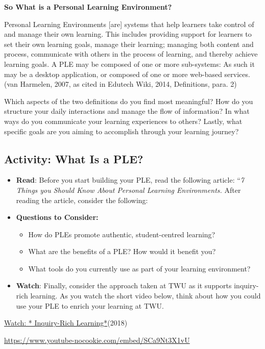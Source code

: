 \documentclass[
  letterpaper,
  DIV=11,
  numbers=noendperiod]{scrreprt}
\providecommand{\tightlist}{%
  \setlength{\itemsep}{0pt}\setlength{\parskip}{0pt}}\usepackage{longtable,booktabs,array}
\begin{document}
\textbf{So What is a Personal Learning Environment?}

Personal Learning Environments {[}are{]} systems that help learners take
control of and manage their own learning. This includes providing
support for learners to set their own learning goals, manage their
learning; managing both content and process, communicate with others in
the process of learning, and thereby achieve learning goals. A PLE may
be composed of one or more sub-systems: As such it may be a desktop
application, or composed of one or more web-based services. (van
Harmelen, 2007, as cited in Edutech Wiki, 2014, Definitions, para. 2)

Which aspects of the two definitions do you find most meaningful? How do
you structure your daily interactions and manage the flow of
information? In what ways do you communicate your learning experiences
to others? Lastly, what specific goals are you aiming to accomplish
through your learning journey?

\subsection{Activity: What Is a PLE?}\label{activity-what-is-a-ple}

\begin{tcolorbox}[enhanced jigsaw, toprule=.15mm, colback=white, colframe=quarto-callout-note-color-frame, bottomtitle=1mm, leftrule=.75mm, coltitle=black, titlerule=0mm, rightrule=.15mm, colbacktitle=quarto-callout-note-color!10!white, left=2mm, title={Learning Activity}, opacitybacktitle=0.6, opacityback=0, breakable, toptitle=1mm, arc=.35mm, bottomrule=.15mm]

\begin{itemize}
\item
  \textbf{Read}: Before you start building your PLE, read the following
  article: ``\emph{7 Things you Should Know About Personal Learning
  Environments.} After reading the article, consider the following:
\item
  \textbf{Questions to Consider:}

  \begin{itemize}
  \tightlist
  \item
    How do PLEs promote authentic, student-centred learning?
  \item
    What are the benefits of a PLE? How would it benefit you?
  \item
    What tools do you currently use as part of your learning
    environment?
  \end{itemize}
\item
  \textbf{Watch}: Finally, consider the approach taken at TWU as it
  supports inquiry-rich learning. As you watch the short video below,
  think about how you could use your PLE to enrich your learning at TWU.
\end{itemize}

\href{https://www.youtube.com/watch?v=SCa9Nt3X1vU}{Watch: * Inquiry-Rich
Learning*}(2018)

\url{https://www.youtube-nocookie.com/embed/SCa9Nt3X1vU}

\end{tcolorbox}
\end{document}
